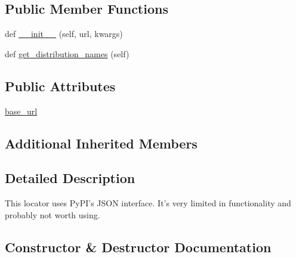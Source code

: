 \subsection*{Public Member Functions}
\begin{DoxyCompactItemize}
\item 
def \hyperlink{classpip_1_1__vendor_1_1distlib_1_1locators_1_1PyPIJSONLocator_a34ba0180a3e8fc3009847cf28d719e99}{\+\_\+\+\_\+init\+\_\+\+\_\+} (self, url, kwargs)
\item 
def \hyperlink{classpip_1_1__vendor_1_1distlib_1_1locators_1_1PyPIJSONLocator_a2a74400546b1af992cc79ae780c014d9}{get\+\_\+distribution\+\_\+names} (self)
\end{DoxyCompactItemize}
\subsection*{Public Attributes}
\begin{DoxyCompactItemize}
\item 
\hyperlink{classpip_1_1__vendor_1_1distlib_1_1locators_1_1PyPIJSONLocator_ac634d501429527ed22e1144d256e98c9}{base\+\_\+url}
\end{DoxyCompactItemize}
\subsection*{Additional Inherited Members}


\subsection{Detailed Description}
\begin{DoxyVerb}This locator uses PyPI's JSON interface. It's very limited in functionality
and probably not worth using.
\end{DoxyVerb}
 

\subsection{Constructor \& Destructor Documentation}
\mbox{\label{classpip_1_1__vendor_1_1distlib_1_1locators_1_1PyPIJSONLocator_a34ba0180a3e8fc3009847cf28d719e99}} 
